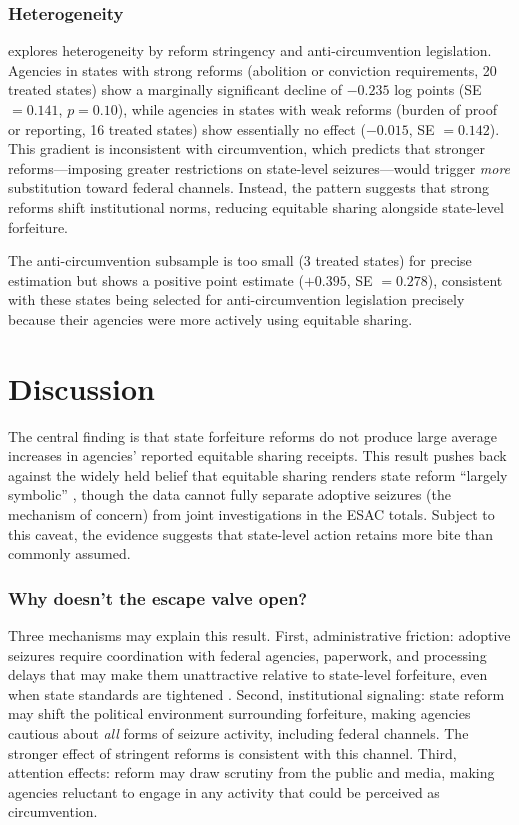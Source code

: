 \documentclass[12pt]{article}
\begin{document}


\subsubsection*{Heterogeneity}  explores heterogeneity by reform stringency and anti-circumvention legislation. Agencies in states with strong reforms (abolition or conviction requirements, 20 treated states) show a marginally significant decline of $-0.235$ log points (SE $= 0.141$, $p = 0.10$), while agencies in states with weak reforms (burden of proof or reporting, 16 treated states) show essentially no effect ($-0.015$, SE $= 0.142$). This gradient is inconsistent with circumvention, which predicts that stronger reforms---imposing greater restrictions on state-level seizures---would trigger \emph{more} substitution toward federal channels. Instead, the pattern suggests that strong reforms shift institutional norms, reducing equitable sharing alongside state-level forfeiture.

The anti-circumvention subsample is too small (3 treated states) for precise estimation but shows a positive point estimate ($+0.395$, SE $= 0.278$), consistent with these states being selected for anti-circumvention legislation precisely because their agencies were more actively using equitable sharing.



\section{Discussion}\label{sec:discussion}

The central finding is that state forfeiture reforms do not produce large average increases in agencies' reported equitable sharing receipts. This result pushes back against the widely held belief that equitable sharing renders state reform ``largely symbolic'' \citep{Carpenter2019}, though the data cannot fully separate adoptive seizures (the mechanism of concern) from joint investigations in the ESAC totals. Subject to this caveat, the evidence suggests that state-level action retains more bite than commonly assumed.

\subsubsection*{Why doesn't the escape valve open?} Three mechanisms may explain this result. First, administrative friction: adoptive seizures require coordination with federal agencies, paperwork, and processing delays that may make them unattractive relative to state-level forfeiture, even when state standards are tightened \citep{Worrall2004}. Second, institutional signaling: state reform may shift the political environment surrounding forfeiture, making agencies cautious about \emph{all} forms of seizure activity, including federal channels. The stronger effect of stringent reforms is consistent with this channel. Third, attention effects: reform may draw scrutiny from the public and media, making agencies reluctant to engage in any activity that could be perceived as circumvention.
\end{document}
